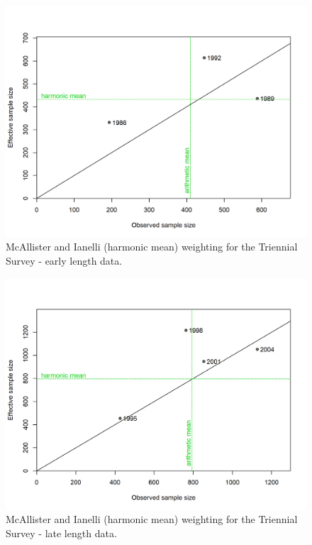 \documentclass[12pt,]{article}
\begin{document}
\FloatBarrier

\begin{figure}
\centering
\includegraphics{r4ss/plots_mod1/comp_lenfit_sampsize_flt5mkt0.png}
\caption{McAllister and Ianelli (harmonic mean) weighting for the
Triennial Survey - early length data. \label{fig:harm_mean_tri_early}}
\end{figure}

\FloatBarrier

\begin{figure}
\centering
\includegraphics{r4ss/plots_mod1/comp_lenfit_sampsize_flt6mkt0.png}
\caption{McAllister and Ianelli (harmonic mean) weighting for the
Triennial Survey - late length data. \label{fig:harm_mean_tri_late}}
\end{figure}
\end{document}
